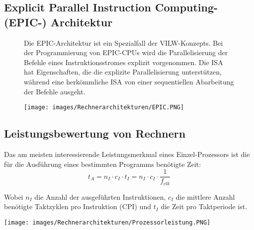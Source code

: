 \subsection{Explicit Parallel Instruction Computing- (EPIC-) Architektur}
\vspace{-0.5cm}
\begin{figure}[htbp]
	
	\begin{minipage}{0.55\textwidth}
Die EPIC-Architektur ist ein  Spezialfall der VILW-Konzepts. Bei der Programmierung von EPIC-CPUs wird die Parallelisierung der Befehle eines Instruktionsstromes explizit vorgenommen. Die ISA hat Eigenschaften, die die explizite Parallelisierung unterstützen, während eine herkömmliche ISA von einer sequentiellen Abarbeitung der Befehle ausgeht.
		
	\end{minipage}
	\hfill		
	\begin{minipage}{0.4\textwidth} 
		\texttt{[image: images/Rechnerarchitekturen/EPIC.PNG]}
	\end{minipage}
	
\end{figure}
\vspace{-1cm}
\subsection{Leistungsbewertung von Rechnern}
Das am meisten interessierende Leistungsmerkmal eines Einzel-Prozessors ist die für die Ausführung eines bestimmten Programms benötigte Zeit:
\begin{equation*}
	t_A = n_I \cdot c_I \cdot t_I = n_I \cdot c_I \cdot \dfrac{1}{f_{clk}} 
\end{equation*}

\begin{minipage}{0.5\linewidth}
Wobei $n_I$ die Anzahl der ausgeführten Instruktionen, $c_I$ die mittlere Anzahl benötigte Taktzyklen pro Instruktion (CPI) und $t_I$ die Zeit pro Taktperiode ist.
\end{minipage}
\begin{minipage}{0.5\linewidth}
	\texttt{[image: images/Rechnerarchitekturen/Prozessorleistung.PNG]}
\end{minipage}